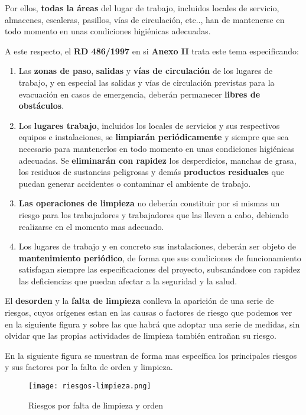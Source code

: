 Por ellos, \textbf{todas la áreas} del lugar de trabajo, incluidos locales de servicio, almacenes, escaleras, pasillos, vías de circulación, etc.., han de mantenerse en todo momento en unas condiciones higiénicas adecuadas.

A este respecto, el \textbf{RD 486/1997} en si \textbf{Anexo II} trata este tema especificando:

\begin{enumerate}
    \item Las \textbf{zonas de paso}, \textbf{salidas} y \textbf{vías de circulación} de los lugares de trabajo, y en especial las salidas y vías de circulación previstas para la evacuación en casos de emergencia, deberán permanecer \textbf{libres de obstáculos}.
    \item Los \textbf{lugares trabajo}, incluidos los locales de servicios y sus respectivos equipos e instalaciones, se \textbf{limpiarán periódicamente} y siempre que sea necesario para mantenerlos en todo momento en unas condiciones higiénicas adecuadas. Se \textbf{eliminarán con rapidez} los desperdicios, manchas de grasa, los residuos de sustancias peligrosas y demás \textbf{productos residuales} que puedan generar accidentes o contaminar el ambiente de trabajo.
    \item \textbf{Las operaciones de limpieza} no deberán constituir por si mismas un riesgo para los trabajadores y trabajadores que las lleven a cabo, debiendo realizarse en el momento mas adecuado.
    \item Los lugares de trabajo y en concreto sus instalaciones, deberán ser objeto de \textbf{mantenimiento periódico}, de forma que sus condiciones de funcionamiento satisfagan siempre las especificaciones del proyecto, subsanándose con rapidez las deficiencias que puedan afectar a la seguridad y la salud.
\end{enumerate}

El \textbf{desorden} y la \textbf{falta de limpieza} conlleva la aparición de una serie de riesgos, cuyos orígenes estan en las causas o factores de riesgo que podemos ver en la siguiente figura y sobre las que habrá que adoptar una serie de medidas, sin olvidar que las propias actividades de limpieza también entrañan su riesgo.

En la siguiente figura se muestran de forma mas específica los principales riesgos y sus factores por la falta de orden y limpieza.

\begin{figure}[H]
    \centering
    \texttt{[image: riesgos-limpieza.png]}
    \caption{Riesgos por falta de limpieza y orden}
\end{figure}

